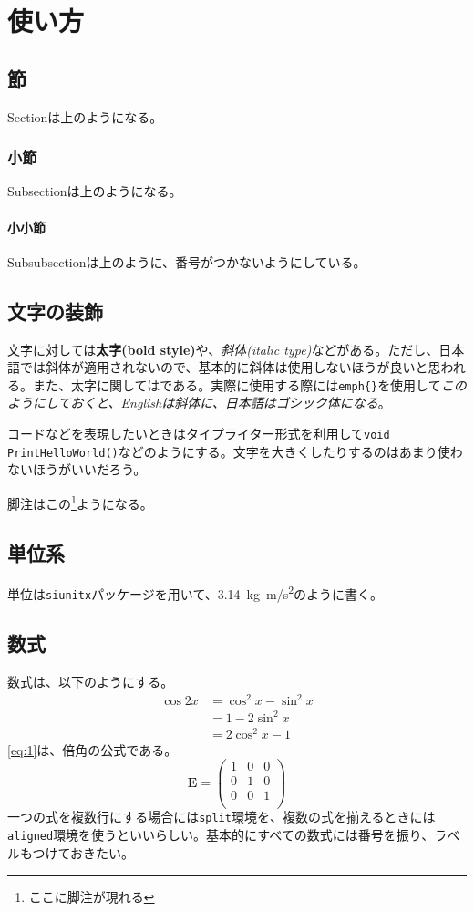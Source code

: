 \chapter{使い方}
\section{節}
Sectionは上のようになる。
\subsection{小節}
Subsectionは上のようになる。
\subsubsection{小小節}
Subsubsectionは上のように、番号がつかないようにしている。

\section{文字の装飾}
文字に対しては\textbf{太字(bold style)}や、\textit{斜体(italic type)}などがある。ただし、日本語では斜体が適用されないので、基本的に斜体は使用しないほうが良いと思われる。また、太字に関しては\textbf{}である。実際に使用する際には\verb|emph{}|を使用して\emph{このようにしておくと、Englishは斜体に、日本語はゴシック体になる}。

コードなどを表現したいときはタイプライター形式を利用して\verb|void PrintHelloWorld()|などのようにする。{\Large 文字を大きくしたり}するのはあまり使わないほうがいいだろう。

脚注はこの\footnote{ここに脚注が現れる}ようになる。

\section{単位系}
単位は\verb|siunitx|パッケージを用いて、\SI{3.14}{kg.m/s^{2}}のように書く。

\section{数式}
数式は、以下のようにする。
\begin{equation}
	\begin{split}
		\cos{2x} &= \cos^2 x - \sin^2 x \\
		&= 1 - 2 \sin^2 x \\
		&= 2 \cos^2 x - 1
	\end{split}
	\label{eq:1}
\end{equation}
\autoref{eq:1}は、倍角の公式である。
\begin{equation}
	\boldsymbol{E}=
	\begin{pmatrix}
		1 & 0 & 0 \\
		0 & 1 & 0 \\
		0 & 0 & 1 \\
	\end{pmatrix}
	\label{eq:2}
\end{equation}
一つの式を複数行にする場合には\verb|split|環境を、複数の式を揃えるときには\verb|aligned|環境を使うといいらしい。基本的にすべての数式には番号を振り、ラベルもつけておきたい。

